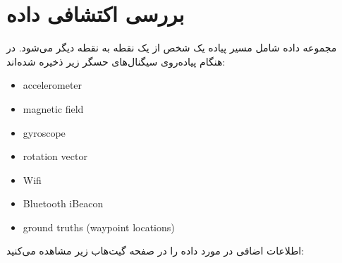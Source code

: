 \documentclass{article}
\begin{document}
\section{بررسی اکتشافی داده}
مجموعه داده شامل مسیر پیاده یک شخص از یک نقطه به نقطه دیگر می‌شود. در هنگام پیاده‌روی سیگنال‌های حسگر زیر ذخیره شده‌اند:
\begin{latin}
\begin{flushleft}
\begin{itemize}
\item
accelerometer
\item
magnetic field
\item
gyroscope
\item
rotation vector
\item
Wifi
\item
Bluetooth iBeacon
\item
ground truths (waypoint locations)
\end{itemize}
\end{flushleft}
\end{latin}
اطلاعات اضافی در مورد داده را در صفحه گیت‌هاب زیر مشاهده می‌کنید:
\begin{flushleft}
	\href{https://github.com/location-competition/indoor-location-competition-20}{}
\end{flushleft}
\end{document}
